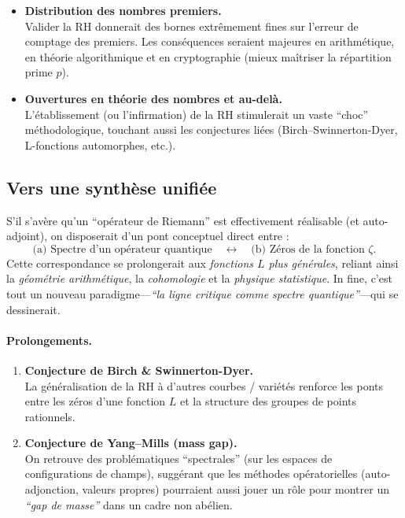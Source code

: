 \documentclass[11pt]{article}
\begin{document}
\begin{itemize}
  \item \textbf{Distribution des nombres premiers.} \\
  Valider la RH donnerait des bornes extrêmement fines sur l'erreur de comptage des premiers. Les conséquences seraient majeures en arithmétique, en théorie algorithmique et en cryptographie (mieux maîtriser la répartition prime $p$).
  \item \textbf{Ouvertures en théorie des nombres et au-delà.} \\
  L'établissement (ou l’infirmation) de la RH stimulerait un vaste “choc” méthodologique, touchant aussi les conjectures liées (Birch--Swinnerton-Dyer, L-fonctions automorphes, etc.).
\end{itemize}

\subsection{Vers une synthèse unifiée}

S’il s’avère qu’un “opérateur de Riemann” est effectivement réalisable (et auto-adjoint), on disposerait d’un pont conceptuel direct entre :
\[
  \text{(a) Spectre d'un opérateur quantique}
  \quad\longleftrightarrow\quad
  \text{(b) Zéros de la fonction $\zeta$}.
\]
Cette correspondance se prolongerait aux \emph{fonctions $L$ plus générales}, reliant ainsi la \emph{géométrie arithmétique}, la \emph{cohomologie} et la \emph{physique statistique}. 
In fine, c’est tout un nouveau paradigme---\emph{“la ligne critique comme spectre quantique”}---qui se dessinerait.

\paragraph{Prolongements.}
\begin{enumerate}
  \item \textbf{Conjecture de Birch \& Swinnerton-Dyer.} \\
    La généralisation de la RH à d'autres courbes / variétés renforce les ponts entre les zéros d’une fonction $L$ et la structure des groupes de points rationnels.
  \item \textbf{Conjecture de Yang--Mills (mass gap).} \\
    On retrouve des problématiques “spectrales” (sur les espaces de configurations de champs), suggérant que les méthodes opératorielles (auto-adjonction, valeurs propres) pourraient aussi jouer un rôle pour montrer un \emph{“gap de masse”} dans un cadre non abélien.
\end{enumerate}
\end{document}
